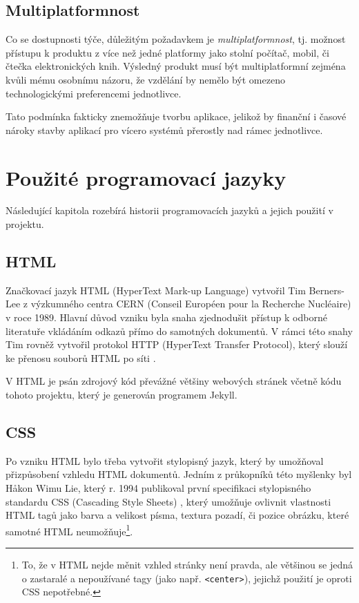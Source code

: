 \documentclass[a4paper, 12pt]{article}
\begin{document}
  \subsection{Multiplatformnost}
  Co se dostupnosti týče, důležitým požadavkem je \emph{multiplatformnost}, tj. možnost přístupu k produktu z více než jedné platformy jako stolní počítač, mobil, či čtečka elektronických knih. Výsledný produkt musí být multiplatformní zejména kvůli mému osobnímu názoru, že vzdělání by nemělo být omezeno technologickými preferencemi jednotlivce.

  Tato podmínka fakticky znemožňuje tvorbu aplikace, jelikož by finanční i časové nároky stavby aplikací pro vícero systémů přerostly nad rámec jednotlivce.


  \section{Použité programovací jazyky}
  Následující kapitola rozebírá historii programovacích jazyků a jejich použití v projektu.



  \subsection{HTML} \label{sec:HTML}
  Značkovací jazyk HTML (HyperText Mark-up Language) vytvořil Tim Berners-Lee z výzkumného centra CERN (Conseil Européen pour la Recherche Nucléaire) v roce 1989. Hlavní důvod vzniku byla snaha zjednodušit přístup k odborné literatuře vkládáním odkazů přímo do samotných dokumentů. V rámci této snahy Tim rovněž vytvořil protokol HTTP (HyperText Transfer Protocol), který slouží ke přenosu souborů HTML po síti \cite{html-history}.


  V HTML je psán zdrojový kód převážné většiny webových stránek včetně kódu tohoto projektu, který je generován programem Jekyll.


  \subsection{CSS} \label{sec:CSS}
  Po vzniku HTML bylo třeba vytvořit stylopisný jazyk, který by umožňoval přizpůsobení vzhledu HTML dokumentů. Jedním z průkopníků této myšlenky byl Håkon Wimu Lie, který r. 1994 publikoval první specifikaci stylopisného standardu CSS (Cascading Style Sheets) \cite{css-proposal, css-saga}, který umožňuje ovlivnit vlastnosti HTML tagů jako barva a velikost písma, textura pozadí, či pozice obrázku, které samotné HTML neumožňuje\footnote{To, že v HTML nejde měnit vzhled stránky není pravda, ale většinou se jedná o zastaralé a nepoužívané tagy (jako např. \texttt{<center>}), jejichž použití je oproti CSS nepotřebné.}.
\end{document}
